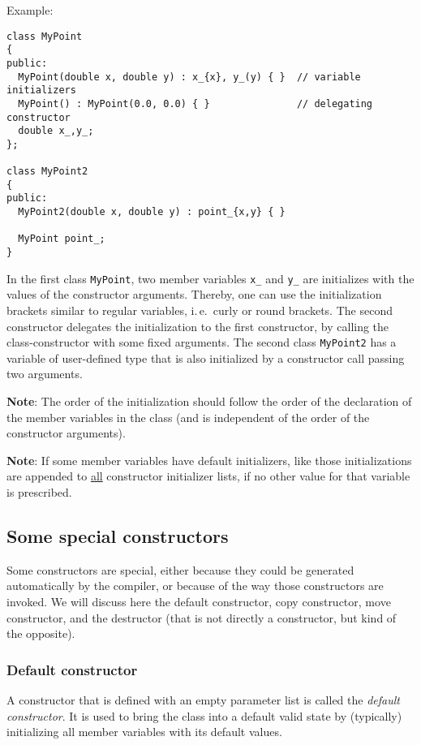 Example:
\begin{verbatim}
class MyPoint
{
public:
  MyPoint(double x, double y) : x_{x}, y_(y) { }  // variable initializers
  MyPoint() : MyPoint(0.0, 0.0) { }               // delegating constructor
  double x_,y_;
};

class MyPoint2
{
public:
  MyPoint2(double x, double y) : point_{x,y} { }

  MyPoint point_;
}
\end{verbatim}
%
In the first class \texttt{MyPoint}, two member variables \texttt{x\_} and \texttt{y\_} are initializes with the values of the constructor arguments. Thereby,
one can use the initialization brackets similar to regular variables, i.\,e.\ curly or round brackets. The second constructor delegates the initialization to
the first constructor, by calling the class-constructor with some fixed arguments. The second class \texttt{MyPoint2} has a variable of user-defined type
that is also initialized by a constructor call passing two arguments.

\textbf{Note}: The order of the initialization should follow the order of the declaration of the member variables in the class (and is independent of the order
of the constructor arguments).

\textbf{Note}: If some member variables have default initializers, like  those initializations are appended to \underline{all} constructor
initializer lists, if no other value for that variable is prescribed.


\subsection{Some special constructors}
Some constructors are special, either because they could be generated automatically by the compiler, or because of the way those constructors are invoked. We
will discuss here the default constructor, copy constructor, move constructor, and the destructor (that is not directly a constructor, but kind of the opposite).


\subsubsection{Default constructor}
A constructor that is defined with an empty parameter list is called the \emph{default constructor}. It is used to bring the class into a default valid state
by (typically) initializing all member variables with its default values.

